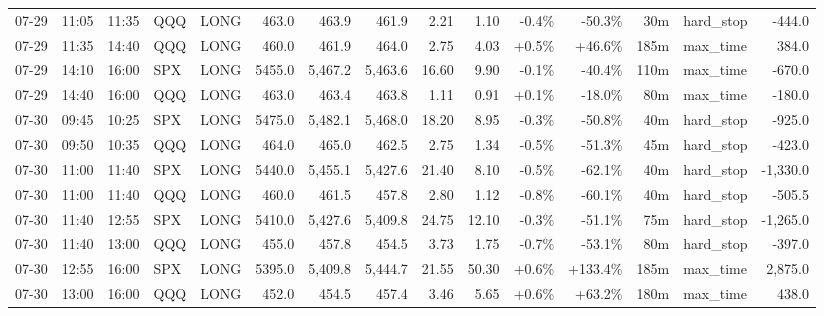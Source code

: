 \documentclass[11pt,a4paper,twoside]{article}
\begin{document}
\begin{landscape}
\begin{center}
\begin{longtable}{>{\color{txtmain}}l l l l l r r r r r r r r >{\color{txtmain}}l r}
07-29 & 11:05 & 11:35 & QQQ & LONG & 463.0 & 463.9 & 461.9 & 2.21 & 1.10 & \textcolor{lossred}{-0.4\%} & \textcolor{lossred}{-50.3\%} & 30m & hard\_stop & \textcolor{lossred}{-444.0} \\
07-29 & 11:35 & 14:40 & QQQ & LONG & 460.0 & 461.9 & 464.0 & 2.75 & 4.03 & \textcolor{wingreen}{+0.5\%} & \textcolor{wingreen}{+46.6\%} & 185m & max\_time & \textcolor{wingreen}{384.0} \\
07-29 & 14:10 & 16:00 & SPX & LONG & 5455.0 & 5,467.2 & 5,463.6 & 16.60 & 9.90 & \textcolor{lossred}{-0.1\%} & \textcolor{lossred}{-40.4\%} & 110m & max\_time & \textcolor{lossred}{-670.0} \\
07-29 & 14:40 & 16:00 & QQQ & LONG & 463.0 & 463.4 & 463.8 & 1.11 & 0.91 & \textcolor{wingreen}{+0.1\%} & \textcolor{lossred}{-18.0\%} & 80m & max\_time & \textcolor{lossred}{-180.0} \\
07-30 & 09:45 & 10:25 & SPX & LONG & 5475.0 & 5,482.1 & 5,468.0 & 18.20 & 8.95 & \textcolor{lossred}{-0.3\%} & \textcolor{lossred}{-50.8\%} & 40m & hard\_stop & \textcolor{lossred}{-925.0} \\
07-30 & 09:50 & 10:35 & QQQ & LONG & 464.0 & 465.0 & 462.5 & 2.75 & 1.34 & \textcolor{lossred}{-0.5\%} & \textcolor{lossred}{-51.3\%} & 45m & hard\_stop & \textcolor{lossred}{-423.0} \\
07-30 & 11:00 & 11:40 & SPX & LONG & 5440.0 & 5,455.1 & 5,427.6 & 21.40 & 8.10 & \textcolor{lossred}{-0.5\%} & \textcolor{lossred}{-62.1\%} & 40m & hard\_stop & \textcolor{lossred}{-1,330.0} \\
07-30 & 11:00 & 11:40 & QQQ & LONG & 460.0 & 461.5 & 457.8 & 2.80 & 1.12 & \textcolor{lossred}{-0.8\%} & \textcolor{lossred}{-60.1\%} & 40m & hard\_stop & \textcolor{lossred}{-505.5} \\
07-30 & 11:40 & 12:55 & SPX & LONG & 5410.0 & 5,427.6 & 5,409.8 & 24.75 & 12.10 & \textcolor{lossred}{-0.3\%} & \textcolor{lossred}{-51.1\%} & 75m & hard\_stop & \textcolor{lossred}{-1,265.0} \\
07-30 & 11:40 & 13:00 & QQQ & LONG & 455.0 & 457.8 & 454.5 & 3.73 & 1.75 & \textcolor{lossred}{-0.7\%} & \textcolor{lossred}{-53.1\%} & 80m & hard\_stop & \textcolor{lossred}{-397.0} \\
07-30 & 12:55 & 16:00 & SPX & LONG & 5395.0 & 5,409.8 & 5,444.7 & 21.55 & 50.30 & \textcolor{wingreen}{+0.6\%} & \textcolor{wingreen}{+133.4\%} & 185m & max\_time & \textcolor{wingreen}{2,875.0} \\
07-30 & 13:00 & 16:00 & QQQ & LONG & 452.0 & 454.5 & 457.4 & 3.46 & 5.65 & \textcolor{wingreen}{+0.6\%} & \textcolor{wingreen}{+63.2\%} & 180m & max\_time & \textcolor{wingreen}{438.0} \\

\end{longtable}
\end{center}
\end{landscape}
\end{document}

